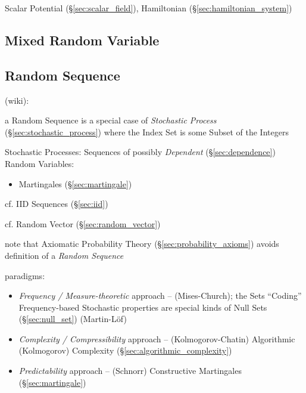 Scalar Potential (\S\ref{sec:scalar_field}), Hamiltonian
(\S\ref{sec:hamiltonian_system})



\subsection{Mixed Random Variable}\label{sec:mixed_random_variable}

\subsection{Random Sequence}\label{sec:random_sequence}

(wiki):

a Random Sequence is a special case of \emph{Stochastic Process}
(\S\ref{sec:stochastic_process}) where the Index Set is some Subset of the
Integers

Stochastic Processes: Sequences of possibly \emph{Dependent}
(\S\ref{sec:dependence}) Random Variables:
\begin{itemize}
  \item Martingales (\S\ref{sec:martingale})
\end{itemize}
cf. IID Sequences (\S\ref{sec:iid})

cf. Random Vector (\S\ref{sec:random_vector})

note that Axiomatic Probability Theory (\S\ref{sec:probability_axioms})
avoids definition of a \emph{Random Sequence}

paradigms:
\begin{itemize}
  \item \emph{Frequency / Measure-theoretic} approach -- (Mises-Church); the
    Sets ``Coding'' Frequency-based Stochastic properties are special kinds of
    Null Sets (\S\ref{sec:null_set}) (Martin-L\"of)
  \item \emph{Complexity / Compressibility} approach -- (Kolmogorov-Chatin)
    Algorithmic (Kolmogorov) Complexity (\S\ref{sec:algorithmic_complexity})
  \item \emph{Predictability} approach -- (Schnorr) Constructive Martingales
    (\S\ref{sec:martingale})
\end{itemize}

